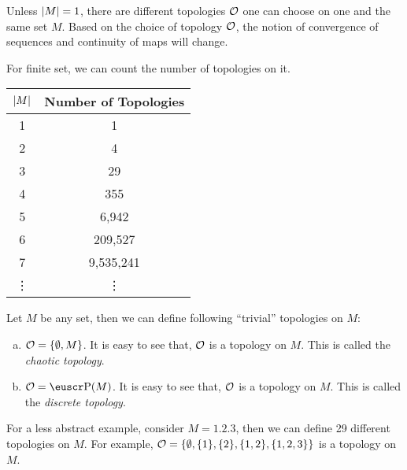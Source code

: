 \begin{remark}
	Unless \(\abs{M} = 1\), there are different topologies \(\mathcal{O}\) one can choose on one and the same set \(M\). Based on the choice of topology \(\mathcal{O}\), the notion of convergence of sequences and continuity of maps will change.
\end{remark}
For finite set, we can count the number of topologies on it.
\begin{table}[H]
	\centering
	\begin{tabular}{c|c}
		\toprule
		\(\abs{M}\) & Number of Topologies \\
		\midrule
		1           & 1                    \\
		2           & 4                    \\
		3           & 29                   \\
		4           & 355                  \\
		5           & 6,942                \\
		6           & 209,527              \\
		7           & 9,535,241            \\
		\vdots      & \vdots               \\
		\bottomrule
	\end{tabular}
\end{table}

\begin{example}
	Let \(M\) be any set, then we can define following ``trivial'' topologies on \(M\):
	\begin{enumerate}[(a)]
		\item \(\mathcal{O} = \qty{\emptyset, M}\). It is easy to see that, \(\mathcal{O}\) is a topology on \(M\). This is called the \emph{chaotic topology}.

		\item \(\O = \powerset(M)\). It is easy to see that, \(\mathcal{O}\) is a topology on \(M\). This is called the \emph{discrete topology}.
	\end{enumerate}
\end{example}
For a less abstract example, consider \(M = \qty{1, 2, 3}\), then we can define 29 different topologies on \(M\). For example, \(\mathcal{O} = \qty{\emptyset, \qty{1}, \qty{2}, \qty{1, 2}, \qty{1, 2, 3}}\) is a topology on \(M\).


